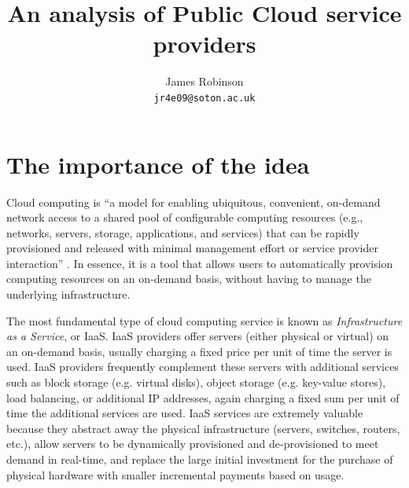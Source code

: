 \documentclass[a4paper]{proc}
\begin{document}
  \title{An analysis of Public Cloud service providers}
  \author{James Robinson\\\texttt{jr4e09@soton.ac.uk}}
  \maketitle

  \begin{abstract}
  \end{abstract}


  \section{The importance of the idea}
  \label{sec:idea}


  Cloud computing is ``a model for enabling ubiquitous, convenient, on-demand network access to a shared pool of configurable computing resources (e.g., networks, servers, storage, applications, and services) that can be rapidly provisioned and released with minimal management effort or service provider interaction'' \cite{Mell2011}. In essence, it is a tool that allows users to automatically provision computing resources on an on-demand basis, without having to manage the underlying infrastructure.

  The most fundamental type of cloud computing service is known as \emph{Infrastructure as a Service}, or IaaS. IaaS providers offer servers (either physical or virtual) on an on-demand basis, usually charging a fixed price per unit of time the server is used. IaaS providers frequently complement these servers with additional services such as block storage (e.g. virtual disks), object storage (e.g. key-value stores), load balancing, or additional IP addresses, again charging a fixed sum per unit of time the additional services are used. IaaS services are extremely valuable because they abstract away the physical infrastructure (servers, switches, routers, etc.), allow servers to be dynamically provisioned and de-provisioned to meet demand in real-time, and replace the large initial investment for the purchase of physical hardware with smaller incremental payments based on usage.
\end{document}

